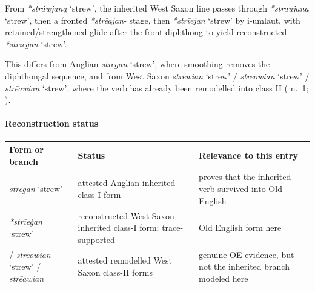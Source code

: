 \documentclass[
  british,
  a4paper,
]{article}
\newcounter{none} %
\providecommand{\Recon}[1]{\emph{*#1}}
\begin{document}
From \Recon{stráwjaną} `strew', the inherited West Saxon line passes
through \Recon{straujaną} `strew', then a fronted \emph{*strēajan-}
stage, then \Recon{strīejan} `strew' by i-umlaut, with
retained/strengthened glide after the front diphthong to yield
reconstructed \Recon{strīeġan} `strew'.

This differs from Anglian {\emph{strēgan}} `strew', where smoothing
removes the diphthongal sequence, and from West Saxon {\emph{strewian}}
`strew' / {\emph{streowian}} `strew' / {\emph{strēawian}} `strew', where
the verb has already been remodelled into class II
( n.~1;
).

\paragraph{Reconstruction status}\label{reconstruction-status-1}

{\def\LTcaptype{none} %
\begin{longtable}[]{@{}
  >{\raggedright\arraybackslash}p{}
  >{\raggedright\arraybackslash}p{}
  >{\raggedright\arraybackslash}p{}@{}}
\toprule\noalign{}
\begin{minipage}[b]{\linewidth}\raggedright
Form or branch
\end{minipage} & \begin{minipage}[b]{\linewidth}\raggedright
Status
\end{minipage} & \begin{minipage}[b]{\linewidth}\raggedright
Relevance to this entry
\end{minipage} \\
\midrule\noalign{}
\endhead
\bottomrule\noalign{}
\endlastfoot
{\emph{strēgan}} `strew' & attested Anglian inherited class-I form &
proves that the inherited verb survived into Old English \\
\Recon{strīeġan} `strew' & reconstructed West Saxon inherited class-I
form; trace-supported & Old English form here \\
{\emph{strewian}} / {\emph{streowian}} `strew' / {\emph{strēawian}} &
attested remodelled West Saxon class-II forms & genuine OE evidence, but
not the inherited branch modeled here \\
\end{longtable}
}
\end{document}
